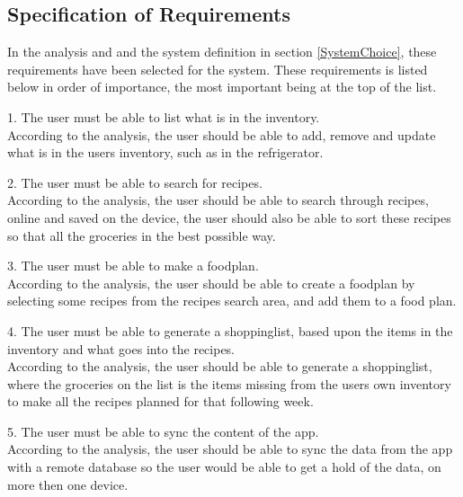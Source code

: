 \subsection{Specification of Requirements}


In the analysis and and the system definition in section \ref{SystemChoice}, these requirements have been selected for the system.
These requirements is listed below in order of importance, the most important being at the top of the list.

1. The user must be able to list what is in the inventory.\\
According to the analysis, the user should be able to add, remove and update what is in the users inventory, such as in the refrigerator.

2. The user must be able to search for recipes.\\
According to the analysis, the user should be able to search through recipes, online and saved on the device, the user should also be able to sort these recipes so that all the groceries in the best possible way.

3. The user must be able to make a foodplan.\\
According to the analysis, the user should be able to create a foodplan by selecting some recipes from the recipes search area, and add them to a food plan.

4. The user must be able to generate a shoppinglist, based upon the items in the inventory and what goes into the recipes.\\
According to the analysis, the user should be able to generate a shoppinglist, where the groceries on the list is the items missing from the users own inventory to make all the recipes planned for that following week.

5. The user must be able to sync the content of the app.\\
According to the analysis, the user should be able to sync the data from the app with a remote database so the user would be able to get a hold of the data, on more then one device.




